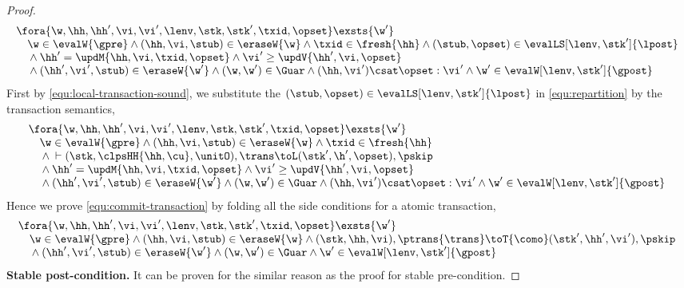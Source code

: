 \begin{proof}
\begin{equation}
\label{equ:repartition}
\begin{array}{@{}l}
    \fora{\w,  \hh, \hh', \vi, \vi', \lenv, \stk, \stk', \txid, \opset} \exsts{\w'} \\
    \quad \w \in \evalW{\gpre}
    \land (\hh, \vi, \stub) \in \eraseW{\w}
    \land \txid \in \fresh{\hh} 
    \land (\stub,\opset) \in \evalLS[\lenv, \stk']{\lpost} \\
    \quad {} \land \hh' = \updM{\hh, \vi, \txid, \opset}  
    \land \vi' \geq \updV{\hh', \vi, \opset} \\
    \quad {} \land (\hh',\vi', \stub) \in \eraseW{\w'}
    \land (\w, \w') \in \Guar 
    \land (\hh, \vi') \csat \opset : \vi' 
    \land \w' \in \evalW[\lenv, \stk']{\gpost}
\end{array}
\end{equation}
First by \cref{equ:local-transaction-sound}, we substitute the \( (\stub, \opset) \in \evalLS[\lenv, \stk']{\lpost}\) in \cref{equ:repartition} by the transaction semantics,
\begin{equation}
\label{equ:combined-transaction-sound}
\begin{array}{@{}l}
    \fora{\w,  \hh, \hh', \vi, \vi', \lenv, \stk, \stk', \txid, \opset} \exsts{\w'} \\
    \quad \w \in \evalW{\gpre}
    \land (\hh, \vi, \stub) \in \eraseW{\w}
    \land \txid \in \fresh{\hh}  \\
    \quad {} \land {} \vdash (\stk, \clpsHH{\hh, \cu}, \unitO), \trans \toL (\stk', \h', \opset), \pskip  \\
    \quad {} \land \hh' = \updM{\hh, \vi, \txid, \opset}  
    \land \vi' \geq \updV{\hh', \vi, \opset} \\
    \quad {} \land (\hh',\vi', \stub) \in \eraseW{\w'}
    \land (\w, \w') \in \Guar 
    \land (\hh, \vi') \csat \opset : \vi' 
    \land \w' \in \evalW[\lenv, \stk']{\gpost}
\end{array}
\end{equation}
Hence we prove \cref{equ:commit-transaction} by folding all the side conditions for a atomic transaction,
\[
\begin{array}{@{}l}
    \fora{\w,  \hh, \hh', \vi, \vi', \lenv, \stk, \stk', \txid, \opset} \exsts{\w'} \\
    \quad \w \in \evalW{\gpre}
    \land (\hh, \vi, \stub) \in \eraseW{\w} 
    \land {} (\stk, \hh, \vi), \ptrans{\trans} \toT{\como} (\stk', \hh', \vi'), \pskip  \\
    \quad {} \land (\hh',\vi', \stub) \in \eraseW{\w'}
    \land (\w, \w') \in \Guar 
    \land \w' \in \evalW[\lenv, \stk']{\gpost}
\end{array}
\]
\textbf{Stable post-condition.} 
It can be proven for the similar reason as the proof for stable pre-condition.


\end{proof}

